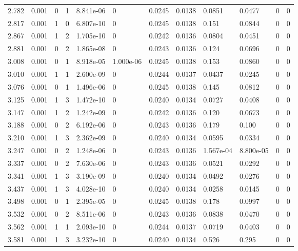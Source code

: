 \documentclass[preview]{standalone}
\begin{document}
{{{\begin{tabular}{L{1.2cm}C{1.2cm} C{0.3cm}C{0.5cm} C{1.4cm}C{1.4cm} C{1.4cm}C{1.4cm} C{1.6cm}C{1.6cm} C{1.6cm}C{1.6cm}}
  2.782  &  0.001  & 0     &  1 &  8.841e-06  & 0  &  0.0245&   0.0138& 0.0851 & 0.0477   &  0 & 0  \\ 
  2.817  &  0.001  & 1     &  0 &  6.807e-10  & 0  &  0.0245&   0.0138& 0.151 & 0.0844   &  0 & 0  \\ 
  2.867  &  0.001  & 1     &  2 &  1.705e-10  & 0  &  0.0242&   0.0136& 0.0804 & 0.0451   &  0 & 0  \\ 
  2.881  &  0.001  & 0     &  2 &  1.865e-08  & 0  &  0.0243&   0.0136& 0.124 & 0.0696   &  0 & 0  \\ 
  3.008  &  0.001  & 0     &  1 &  8.918e-05  & 1.000e-06  &  0.0245&   0.0138& 0.153 & 0.0860   &  0 & 0  \\ 
  3.010  &  0.001  & 1     &  1 &  2.600e-09  & 0  &  0.0244&   0.0137& 0.0437 & 0.0245   &  0 & 0  \\ 
  3.076  &  0.001  & 0     &  1 &  1.496e-06  & 0  &  0.0245&   0.0138& 0.145 & 0.0812   &  0 & 0  \\ 
  3.125  &  0.001  & 1     &  3 &  1.472e-10  & 0  &  0.0240&   0.0134& 0.0727 & 0.0408   &  0 & 0  \\ 
  3.147  &  0.001  & 1     &  2 &  1.242e-09  & 0  &  0.0242&   0.0136& 0.120 & 0.0673   &  0 & 0  \\ 
  3.188  &  0.001  & 0     &  2 &  6.192e-06  & 0  &  0.0243&   0.0136& 0.179 & 0.100   &  0 & 0  \\ 
  3.210  &  0.001  & 1     &  3 &  2.362e-09  & 0  &  0.0240&   0.0134& 0.0595 & 0.0334   &  0 & 0  \\ 
  3.247  &  0.001  & 0     &  2 &  1.248e-06  & 0  &  0.0243&   0.0136& 1.567e-04 & 8.800e-05   &  0 & 0  \\ 
  3.337  &  0.001  & 0     &  2 &  7.630e-06  & 0  &  0.0243&   0.0136& 0.0521 & 0.0292   &  0 & 0  \\ 
  3.341  &  0.001  & 1     &  3 &  3.190e-09  & 0  &  0.0240&   0.0134& 0.0492 & 0.0276   &  0 & 0  \\ 
  3.437  &  0.001  & 1     &  3 &  4.028e-10  & 0  &  0.0240&   0.0134& 0.0258 & 0.0145   &  0 & 0  \\ 
  3.498  &  0.001  & 0     &  1 &  2.395e-05  & 0  &  0.0245&   0.0138& 0.178 & 0.0997   &  0 & 0  \\ 
  3.532  &  0.001  & 0     &  2 &  8.511e-06  & 0  &  0.0243&   0.0136& 0.0838 & 0.0470   &  0 & 0  \\ 
  3.562  &  0.001  & 1     &  1 &  2.093e-10  & 0  &  0.0244&   0.0137& 0.0719 & 0.0403   &  0 & 0  \\ 
  3.581  &  0.001  & 1     &  3 &  3.232e-10  & 0  &  0.0240&   0.0134& 0.526 & 0.295   &  0 & 0  \\ 

\end{tabular}}}}
\end{document}
